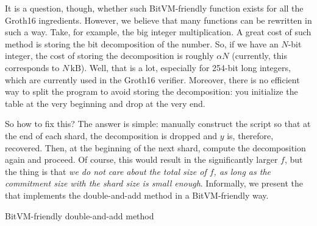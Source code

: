 \documentclass{iacrtrans}
\begin{document}
It is a question, though, whether such BitVM-friendly function exists for all
the Groth16 ingredients. However, we believe that many functions can be
rewritten in such a way. Take, for example, the big integer multiplication. A
great cost of such method is storing the bit decomposition of the number. So, if
we have an $N$-bit integer, the cost of storing the decomposition is roughly
$\alpha N$ (currently, this corresponds to $N \, \text{kB}$). Well, that is a
lot, especially for 254-bit long integers, which are currently used in the
Groth16 verifier. Moreover, there is no efficient way to split the program to
avoid storing the decomposition: you initialize the table at the very beginning
and drop at the very end.

So how to fix this? The answer is simple: manually construct the script so that
at the end of each shard, the decomposition is dropped and $y$ is, therefore,
recovered. Then, at the beginning of the next shard, compute the decomposition
again and proceed. Of course, this would result in the significantly larger $f$,
but the thing is that \textit{we do not care about the total size of $f$, as
long as the commitment size with the shard size is small enough}. Informally, we
present the  that implements the
double-and-add method in a BitVM-friendly way.

\begin{algorithm}
  \caption{BitVM-friendly double-and-add method}\label{alg:double_and_add}
  
  

  \label{alg:double_and_add_bitvm_friendly}
  
\end{algorithm}
\end{document}
